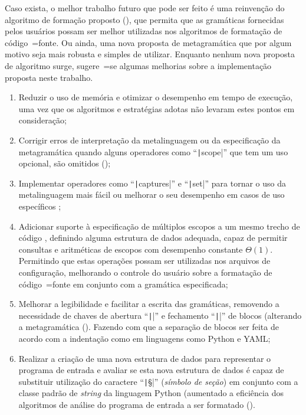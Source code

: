 Caso exista,
o melhor trabalho futuro que pode ser feito é uma reinvenção do algoritmo de formação proposto (),
que permita que as gramáticas fornecidas pelos usuários possam ser melhor utilizadas nos algoritmos de formatação de código~=fonte.
Ou ainda,
uma nova proposta de metagramática que por algum motivo seja mais robusta e
simples de utilizar.
Enquanto nenhum nova proposta de algoritmo surge,
sugere~=se algumas melhorias sobre a implementação proposta neste trabalho.
\begin{enumerate}
\item Reduzir o uso de memória e
otimizar o desempenho em tempo de execução,
uma vez que os algoritmos e
estratégias adotas não levaram estes pontos em consideração;
\item Corrigir erros de interpretação da metalinguagem ou
da especificação da metagramática quando alguns operadores como ``\texttt|scope|'' que tem um uso opcional,
são omitidos ();
\item Implementar operadores como ``\texttt|captures|'' e
``\texttt|set|'' para tornar o uso da metalinguagem mais fácil ou
melhorar o seu desempenho em casos de uso específicos \cite{sublimeTextSyntax};
\item Adicionar suporte à especificação de múltiplos escopos a um mesmo trecho de código \cite{vsCodeSyntaxHighlighthing},
definindo alguma estrutura de dados adequada,
capaz de permitir consultas e
aritméticas de escopos \cite{textMateScopeExclusion} com desempenho constante $\Theta(1)$.
Permitindo que estas operações possam ser utilizadas nos arquivos de configuração,
melhorando o controle do usuário sobre a formatação de código~=fonte em conjunto com a gramática especificada;
\item Melhorar a legibilidade e
facilitar a escrita das gramáticas,
removendo a necessidade de chaves de abertura ``\texttt|{|'' e
fechamento ``\texttt|}|'' de blocos (alterando a metagramática ().
Fazendo com que a separação de blocos ser feita de acordo com a indentação como em linguagens como Python e
YAML;
\item Realizar a criação de uma nova estrutura de dados para representar o programa de entrada e
avaliar se esta nova estrutura de dados é capaz de substituir utilização do caractere ``\texttt|§|'' (\textit{símbolo de seção}) em conjunto com a classe padrão de \textit{string} da linguagem Python (aumentado a eficiência dos algoritmos de análise do programa de entrada a ser formatado ().

\end{enumerate}

